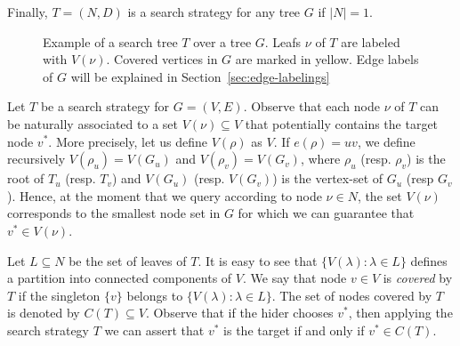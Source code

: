 \documentclass[11pt]{article}
\newcommand\+{\mkern2mu}
\newcommand{\T}{T}
\begin{document}
Finally, $\T=(N,D)$ is a search strategy for any tree $G$ if $|N|=1$.

\begin{figure}[htb]
    \centering
{}    \caption{Example of a search tree $T$ over a tree $G$. Leafs $\nu$ of $T$ are labeled with $V(\nu)$. Covered vertices in $G$ are marked in yellow. Edge labels of $G$ will be explained in Section~\ref{sec:edge-labelings}}
    \label{fig:def-search-tree}
\end{figure}

Let $\T$ be a search strategy for $G=(V,E)$. Observe that each node $\nu$ of $\T$ can be naturally associated to a set $V(\nu)\subseteq V$ that potentially contains the target node $v^*$. More precisely, let us define $V(\rho)$ as $V$. If $e(\rho)=uv$, we define recursively $V(\rho_u)= V(G_u)$ and $V(\rho_v)= V(G_v)$, where $\rho_u$ (resp. $\rho_v$) is the root of $T_u$ (resp. $T_v$) and $V(G_u)$ (resp. $V(G_v)$) is the vertex-set of $G_u$ (resp $G_v$). Hence, at the moment that we query according to node $\nu\in N$, the set $V(\nu)$ corresponds to the smallest node set in $G$ for which we can guarantee that $v^*\in V(\nu)$. 

Let $L\subseteq N$ be the set of leaves of $\T$. It is easy to see that $\{V(\lambda): \lambda \in L\}$ defines a partition into connected components of $V$. We say that node $v \in V$ is \emph{covered} by $\T$ if the singleton $\{v\}$ belongs to $\{V(\lambda): \lambda \in L\}$. The set of nodes covered by $\T$ is denoted by $C(\T)\subseteq V$. Observe that if the hider chooses $v^*$, then applying the search strategy $\T$ we can assert that $v^*$ is the target if and only if $v^*\in C(T)$. 
\end{document}
